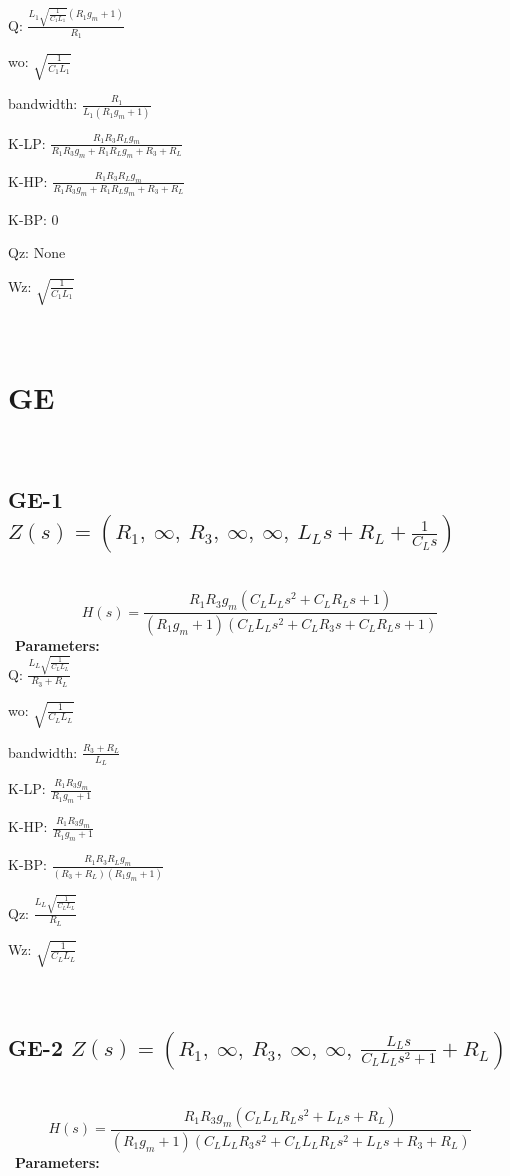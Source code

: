 \documentclass{article}
\begin{document}
Q: $\frac{L_{1} \sqrt{\frac{1}{C_{1} L_{1}}} \left(R_{1} g_{m} + 1\right)}{R_{1}}$\ 

wo: $\sqrt{\frac{1}{C_{1} L_{1}}}$\ 

bandwidth: $\frac{R_{1}}{L_{1} \left(R_{1} g_{m} + 1\right)}$\ 

K-LP: $\frac{R_{1} R_{3} R_{L} g_{m}}{R_{1} R_{3} g_{m} + R_{1} R_{L} g_{m} + R_{3} + R_{L}}$\ 

K-HP: $\frac{R_{1} R_{3} R_{L} g_{m}}{R_{1} R_{3} g_{m} + R_{1} R_{L} g_{m} + R_{3} + R_{L}}$\ 

K-BP: $0$\ 

Qz: $\text{None}$\ 

Wz: $\sqrt{\frac{1}{C_{1} L_{1}}}$\ 

\ 

\section{GE}\ 
\subsection{GE-1 $Z(s) = \left( R_{1}, \  \infty, \  R_{3}, \  \infty, \  \infty, \  L_{L} s + R_{L} + \frac{1}{C_{L} s}\right)$ } \ 
\textbf{\[H(s) = \frac{R_{1} R_{3} g_{m} \left(C_{L} L_{L} s^{2} + C_{L} R_{L} s + 1\right)}{\left(R_{1} g_{m} + 1\right) \left(C_{L} L_{L} s^{2} + C_{L} R_{3} s + C_{L} R_{L} s + 1\right)}\] } \ 
\textbf{Parameters:}\\ 

Q: $\frac{L_{L} \sqrt{\frac{1}{C_{L} L_{L}}}}{R_{3} + R_{L}}$\ 

wo: $\sqrt{\frac{1}{C_{L} L_{L}}}$\ 

bandwidth: $\frac{R_{3} + R_{L}}{L_{L}}$\ 

K-LP: $\frac{R_{1} R_{3} g_{m}}{R_{1} g_{m} + 1}$\ 

K-HP: $\frac{R_{1} R_{3} g_{m}}{R_{1} g_{m} + 1}$\ 

K-BP: $\frac{R_{1} R_{3} R_{L} g_{m}}{\left(R_{3} + R_{L}\right) \left(R_{1} g_{m} + 1\right)}$\ 

Qz: $\frac{L_{L} \sqrt{\frac{1}{C_{L} L_{L}}}}{R_{L}}$\ 

Wz: $\sqrt{\frac{1}{C_{L} L_{L}}}$\ 

\ 

\subsection{GE-2 $Z(s) = \left( R_{1}, \  \infty, \  R_{3}, \  \infty, \  \infty, \  \frac{L_{L} s}{C_{L} L_{L} s^{2} + 1} + R_{L}\right)$ } \ 
\textbf{\[H(s) = \frac{R_{1} R_{3} g_{m} \left(C_{L} L_{L} R_{L} s^{2} + L_{L} s + R_{L}\right)}{\left(R_{1} g_{m} + 1\right) \left(C_{L} L_{L} R_{3} s^{2} + C_{L} L_{L} R_{L} s^{2} + L_{L} s + R_{3} + R_{L}\right)}\] } \ 
\textbf{Parameters:}\\ 
\end{document}
